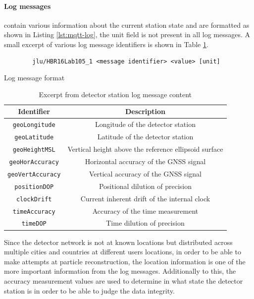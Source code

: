 \documentclass[abstract,toc,los,lof,english,10pt,glossary,acronyms]{jluthesis}
\begin{document}
\paragraph{Log messages} contain various information about the current station state and are formatted as shown in Listing \ref{lst:mqtt-log}, the unit field is not present in all log messages. A small excerpt of various log message identifiers is shown in Table \ref{tab:station_logs}.
\begin{lstfloat}[H]
	\centering
	\begin{verbatim}
		jlu/HBR16Lab105_1 <message identifier> <value> [unit]
	\end{verbatim}
	\caption{Log message format}
	\label{lst:mqtt-log}
\end{lstfloat}
\begin{table}[H]
	\centering
	\begin{tabular}{| c | c |}
		\hline
		\textbf{Identifier} & \textbf{Description} \\
		\hline
		\verb*|geoLongitude| & Longitude of the detector station \\
		\hline
		\verb*|geoLatitude| & Latitude of the detector station \\
		\hline
		\verb*|geoHeightMSL| & Vertical height above the reference ellipsoid surface \\
		\hline
		\verb*|geoHorAccuracy| & Horizontal accuracy of the GNSS signal \\
		\hline
		\verb*|geoVertAccuracy| & Vertical accuracy of the GNSS signal \\
		\hline
		\verb*|positionDOP| & Positional dilution of precision\footnotemark \\
		\hline
		\verb*|clockDrift| & Current inherent drift of the internal clock\\
		\hline
		\verb*|timeAccuracy| & Accuracy of the time measurement \\
		\hline
		\verb*|timeDOP| & Time dilution of precision \\
		\hline
	\end{tabular}
	\caption{Excerpt from detector station log message content}
	\label{tab:station_logs}
\end{table}
Since the detector network is not at known locations but distributed across multiple cities and countries at different users locations, in order to be able to make attempts at particle reconstruction, the location information is one of the more important information from the log messages. Additionally to this, the accuracy measurement values are used to determine in what state the detector station is in order to be able to judge the data integrity.
\clearpage
\end{document}
